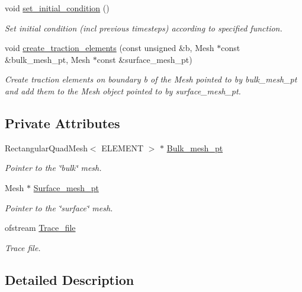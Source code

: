 \begin{DoxyCompactItemize}
void \hyperlink{classRayleighTractionProblem_ad6394f146505e00aeba2fc37f2c75488}{set\+\_\+initial\+\_\+condition} ()
\begin{DoxyCompactList}\small\item\em Set initial condition (incl previous timesteps) according to specified function. \end{DoxyCompactList}\item 
void \hyperlink{classRayleighTractionProblem_a3a94c245abf443c436eb8a94be19a9f9}{create\+\_\+traction\+\_\+elements} (const unsigned \&b, Mesh $\ast$const \&bulk\+\_\+mesh\+\_\+pt, Mesh $\ast$const \&surface\+\_\+mesh\+\_\+pt)
\begin{DoxyCompactList}\small\item\em Create traction elements on boundary b of the Mesh pointed to by bulk\+\_\+mesh\+\_\+pt and add them to the Mesh object pointed to by surface\+\_\+mesh\+\_\+pt. \end{DoxyCompactList}\end{DoxyCompactItemize}
\subsection*{Private Attributes}
\begin{DoxyCompactItemize}
\item 
Rectangular\+Quad\+Mesh$<$ E\+L\+E\+M\+E\+NT $>$ $\ast$ \hyperlink{classRayleighTractionProblem_a21664c5b87a5ae008842a150539496ad}{Bulk\+\_\+mesh\+\_\+pt}
\begin{DoxyCompactList}\small\item\em Pointer to the \char`\"{}bulk\char`\"{} mesh. \end{DoxyCompactList}\item 
Mesh $\ast$ \hyperlink{classRayleighTractionProblem_ac47f90966608b8797074f5a3fb9ff40a}{Surface\+\_\+mesh\+\_\+pt}
\begin{DoxyCompactList}\small\item\em Pointer to the \char`\"{}surface\char`\"{} mesh. \end{DoxyCompactList}\item 
ofstream \hyperlink{classRayleighTractionProblem_aac28de2e912d5a48638d3399914ac153}{Trace\+\_\+file}
\begin{DoxyCompactList}\small\item\em Trace file. \end{DoxyCompactList}\end{DoxyCompactItemize}


\subsection{Detailed Description}

